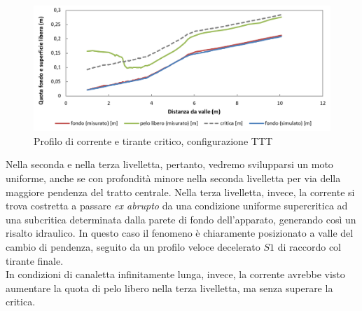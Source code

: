 \documentclass[12pt]{article} %
\begin{document}
\begin{figure}[H]
    \centering
    \includegraphics[width=\textwidth]{TTTbasecritica.png}
    \caption{Profilo di corrente e tirante critico, configurazione TTT}
    \label{fig:critica_TTT}
\end{figure}

\noindent Nella seconda e nella terza livelletta, pertanto, vedremo svilupparsi un moto uniforme, anche se con profondità minore nella seconda livelletta per via della maggiore pendenza del tratto centrale. Nella terza livelletta, invece, la corrente si trova costretta a passare \textit{ex abrupto} da una condizione uniforme supercritica ad una subcritica determinata dalla parete di fondo dell'apparato, generando così un risalto idraulico. In questo caso il fenomeno è chiaramente posizionato a valle del cambio di pendenza, seguito da un profilo veloce decelerato $S1$ di raccordo col tirante finale.\\ 
In condizioni di canaletta infinitamente lunga, invece, la corrente avrebbe visto aumentare la quota di pelo libero nella terza livelletta, ma senza superare la critica.
\end{document}
